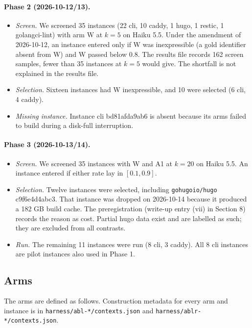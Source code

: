 \documentclass[10pt]{article}
\begin{document}
\paragraph{Phase 2 (2026-10-12/13).}
\begin{itemize}
\item \emph{Screen.} We screened 35 instances (22 cli, 10 caddy, 1 hugo, 1 restic, 1 golangci-lint) with arm W at $k=5$ on Haiku 5.5. Under the amendment of 2026-10-12, an instance entered only if W was inexpressible (a gold identifier absent from W) and W passed below 0.8. The results file records 162 screen samples, fewer than 35 instances at $k=5$ would give. The shortfall is not explained in the results file.
\item \emph{Selection.} Sixteen instances had W inexpressible, and 10 were selected (6 cli, 4 caddy).
\item \emph{Missing instance.} Instance cli bd81afda9ab6 is absent because its arms failed to build during a disk-full interruption.
\end{itemize}

\paragraph{Phase 3 (2026-10-13/14).}
\begin{itemize}
\item \emph{Screen.} We screened 35 instances with W and A1 at $k=20$ on Haiku 5.5. An instance entered if either rate lay in $[0.1, 0.9]$.
\item \emph{Selection.} Twelve instances were selected, including \texttt{gohugoio/hugo} c9f6e4d4abc3. That instance was dropped on 2026-10-14 because it produced a 182 GB build cache. The preregistration (write-up entry (vii) in Section 8) records the reason as cost. Partial hugo data exist and are labelled as such; they are excluded from all contrasts.
\item \emph{Run.} The remaining 11 instances were run (8 cli, 3 caddy). All 8 cli instances are pilot instances also used in Phase 1.
\end{itemize}

\subsection{Arms}\label{sec:arms}

The arms are defined as follows. Construction metadata for every arm and instance is in \texttt{harness/abl-*/contexts.json} and \texttt{harness/ablr-*/contexts.json}.
\end{document}
